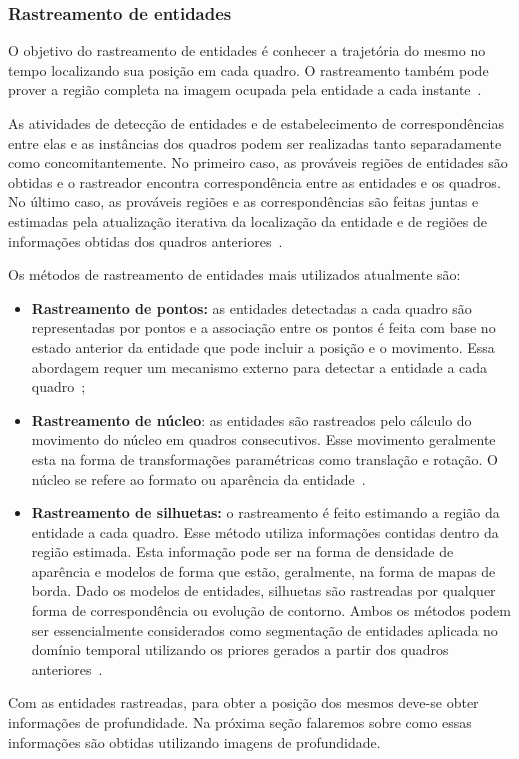 
\subsubsection{Rastreamento de entidades}
\label{sec:rastreamento}

	O objetivo do rastreamento de entidades é conhecer a trajetória do mesmo no
	tempo localizando sua posição em cada quadro. O rastreamento também pode
	prover a região completa na imagem ocupada pela entidade a cada
	instante~\cite{yilmaz}.

	As atividades de detecção de entidades e de estabelecimento de correspondências
	entre elas e as instâncias dos quadros podem ser realizadas tanto
	separadamente como concomitantemente. No primeiro caso, as prováveis regiões de
	entidades são obtidas e o rastreador encontra correspondência entre as entidades
	e os quadros. No último caso, as prováveis regiões e as correspondências
	são feitas juntas e estimadas pela atualização iterativa da localização da
	entidade e de regiões de informações obtidas dos quadros
	anteriores~\cite{yilmaz}.\

	Os métodos de rastreamento de entidades mais utilizados atualmente são:

	\begin{itemize}
		\item \textbf{Rastreamento de pontos:} as entidades detectadas a cada quadro
		são representadas por pontos e a associação entre os pontos é feita com base no
		estado anterior da entidade que pode incluir a posição e o movimento. Essa
		abordagem requer um mecanismo externo para detectar a entidade a cada
		quadro~\cite{yilmaz};
		
		\item \textbf{Rastreamento de núcleo}: as entidades são rastreados pelo cálculo
		do movimento do núcleo em quadros consecutivos. Esse movimento
		geralmente esta na forma de transformações paramétricas como translação e
		rotação. O núcleo se refere ao formato ou aparência da entidade~\cite{yilmaz}.
		
		\item \textbf{Rastreamento de silhuetas:} o rastreamento é feito estimando a
		região da entidade a cada quadro. Esse método utiliza informações contidas
		dentro da região estimada. Esta informação pode ser na forma de densidade de
		aparência e modelos de forma que estão, geralmente, na forma de mapas de borda.
		Dado os modelos de entidades, silhuetas são rastreadas por qualquer forma de
		correspondência ou evolução de contorno. Ambos os métodos podem ser
		essencialmente considerados como segmentação de entidades aplicada no domínio
		temporal utilizando os priores gerados a partir dos quadros
		anteriores~\cite{yilmaz}.
	\end{itemize}

Com as entidades rastreadas, para obter a posição dos mesmos deve-se obter
informações de profundidade. Na próxima seção falaremos sobre como essas
informações são obtidas utilizando imagens de profundidade.




